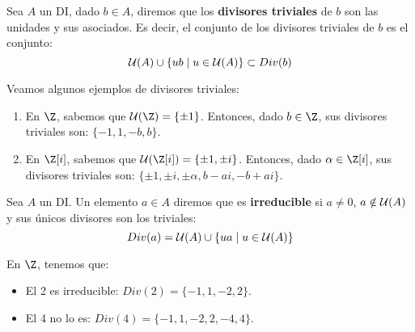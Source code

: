 \begin{definicion}
    Sea $A$ un DI, dado $b \in A$, diremos que los \textbf{divisores triviales} de $b$ son las unidades y sus asociados.
    Es decir, el conjunto de los divisores triviales de $b$ es el conjunto:
    $$\mathcal{U}(A) \cup \{ub \mid u \in \mathcal{U}(A) \} \subset Div(b)$$
\end{definicion}

\begin{ejemplo} Veamos algunos ejemplos de divisores triviales:
\begin{enumerate}
    \item En $\Z$, sabemos que $\cc{U}(\Z)=\{\pm 1\}$. Entonces, dado $b \in \Z$, sus divisores triviales son: $\{-1, 1, -b, b\}$.

    \item En $\Z[i]$, sabemos que $\cc{U}(\Z[i])=\{\pm 1, \pm i\}$. Entonces, dado $\alpha \in \Z[i]$, sus divisores triviales son: $\{\pm 1, \pm i, \pm \alpha, b-ai, -b+ai\}$.
\end{enumerate}
\end{ejemplo}

\begin{definicion}[Irreducible]
    Sea $A$ un DI. Un elemento $a \in A$ diremos que es \textbf{irreducible} si $a \neq 0$, $a \notin \mathcal{U}(A)$ y sus únicos
    divisores son los triviales:
    $$Div(a) = \mathcal{U}(A) \cup \{ua \mid u \in \mathcal{U}(A) \}$$
\end{definicion}

\begin{ejemplo} En $\Z$, tenemos que:
\begin{itemize}
    \item El 2 es irreducible: $Div(2) = \{-1, 1, -2, 2\}$.
    \item El 4 no lo es: $Div(4) = \{-1, 1, -2, 2, -4, 4\}$.
\end{itemize}
\end{ejemplo}

